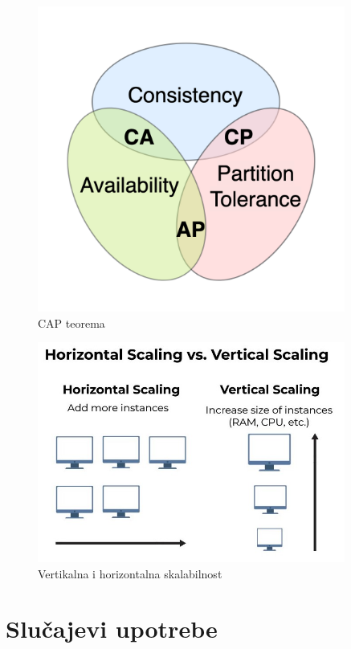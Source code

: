 \documentclass[12pt,oneside]{memoir}
\begin{document}
\begin{figure}[!ht]
  \centering
  \includegraphics[width=0.9\textwidth]{cap.png}
  \caption{CAP teorema}
  \label{fig:grafikon}
\end{figure}

\begin{figure}[!ht]
  \centering
  \includegraphics[width=0.9\textwidth]{horizontal-vertical-scaling.jpg}
  \caption{Vertikalna i horizontalna skalabilnost}
  \label{fig:grafikon}
\end{figure}
\chapter{Slučajevi upotrebe}
\end{document}
